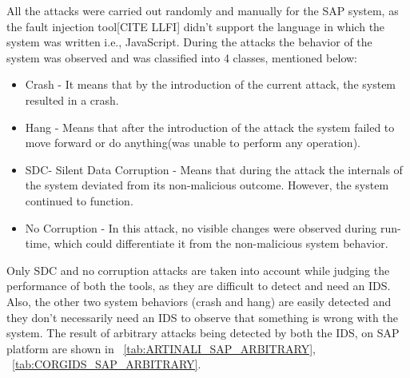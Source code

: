 All the attacks were carried out randomly and manually for the SAP system, as the fault injection tool[CITE LLFI] didn't support the language in which the system was written i.e., JavaScript. During the attacks the behavior of the system was observed and was classified into 4 classes, mentioned below:

\begin{itemize}
\item Crash - It means that by the introduction of the current attack, the system resulted in a crash.
\item Hang - Means that after the introduction of the attack the system failed to move forward or do anything(was unable to perform any operation).
\item SDC- Silent Data Corruption - Means that during the attack the internals of the system deviated from its non-malicious outcome. However, the system continued to function.
\item No Corruption - In this attack, no visible changes were observed during run-time, which could differentiate it from the non-malicious system behavior.
\end{itemize}

Only SDC and no corruption attacks are taken into account while judging the performance of both the tools, as they are difficult to detect and need an IDS. Also, the other two system behaviors (crash and hang) are easily detected and they don't necessarily need an IDS to observe that something is wrong with the system. The result of arbitrary attacks being detected by both the IDS, on SAP platform are shown in ~\autoref{tab:ARTINALI_SAP_ARBITRARY}, ~\autoref{tab:CORGIDS_SAP_ARBITRARY}.


\begin{table}
\centering
  \caption{Results of intrusion detection by ARTINALI for Arbitrary attacks on SAP platform}
  \label{tab:ARTINALI_SAP_ARBITRARY}
\end{table}


\begin{table}
\centering
  \caption{Results of intrusion detection by CORGIDS for Arbitrary attacks on SAP platform}
  \label{tab:CORGIDS_SAP_ARBITRARY}
\end{table}

